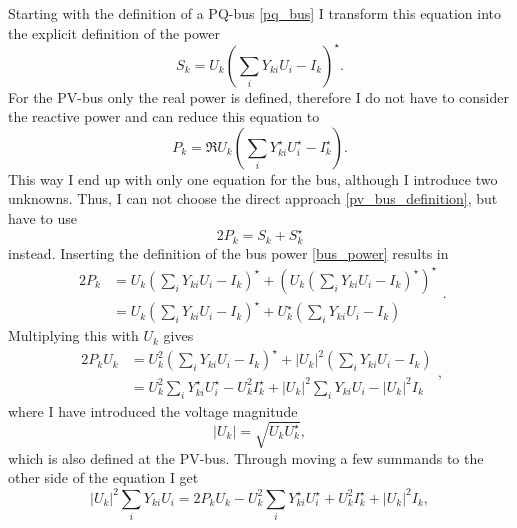 Starting with the definition of a PQ-bus \eqref{pq_bus} I transform this equation into the explicit definition of the power
\begin{equation}
	S_k = U_k \left( \sum_i Y_{ki} U_i - I_k \right)^\star.
	\label{eq:bus_power}
\end{equation}
For the PV-bus only the real power is defined, therefore I do not have to consider the reactive power and can reduce this equation to
\begin{equation}
	P_k = \Re{U_k \left( \sum_i Y_{ki}^\star U_i^\star - I_k^\star \right)}.
	\label{eq:pv_bus_definition}
\end{equation}
This way I end up with only one equation for the bus, although I introduce two unknowns. Thus, I can not choose the direct approach \eqref{pv_bus_definition}, but have to use
\begin{equation}
	2 P_k = S_k + S_k^\star
\end{equation}
instead. Inserting the definition of the bus power \eqref{bus_power} results in
\begin{equation}
	\begin{split}
		2 P_k 	& = U_k \left( \sum_i Y_{ki} U_i - I_k \right)^\star + \left( U_k \left( \sum_i Y_{ki} U_i - I_k \right)^\star \right)^\star \\
				& = U_k \left( \sum_i Y_{ki} U_i - I_k \right)^\star + U_k^\star \left( \sum_i Y_{ki} U_i - I_k \right)
	\end{split}.
\end{equation}
Multiplying this with $U_k$ gives
\begin{equation}
	\begin{split}
		2 P_k U_k 	& = U_k^2 \left( \sum_i Y_{ki} U_i - I_k \right)^\star + |U_k|^2 \left( \sum_i Y_{ki} U_i - I_k \right) \\
					& = U_k^2 \sum_i Y_{ki}^\star U_i^\star - U_k^2 I_k^\star + |U_k|^2 \sum_i Y_{ki} U_i - |U_k|^2 I_k
	\end{split},
\end{equation}
where I have introduced the voltage magnitude 
\begin{equation}
	|U_k| = \sqrt{U_k U_k^\star},
\end{equation}
which is also defined at the PV-bus. Through moving a few summands to the other side of the equation I get
\begin{equation}
	|U_k|^2 \sum_i Y_{ki} U_i = 2 P_k U_k - U_k^2 \sum_i Y_{ki}^\star U_i^\star + U_k^2 I_k^\star + |U_k|^2 I_k,
\end{equation}
